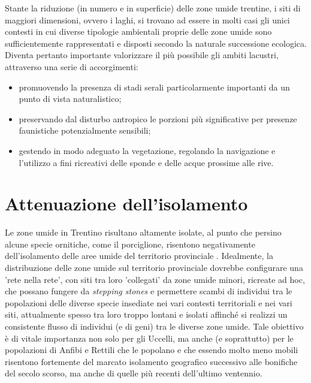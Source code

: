 \documentclass[10pt,twoside,openany,x11names,svgnames,italian,a5paper,dvipsnames,table]{memoir}
\begin{document}
Stante la riduzione (in numero e in superficie) delle zone umide trentine, i siti di maggiori dimensioni, ovvero i laghi, si trovano ad essere in molti casi gli unici contesti in cui diverse tipologie ambientali proprie delle zone umide sono sufficientemente rappresentati e disposti secondo la naturale successione ecologica. Diventa pertanto importante valorizzare il più possibile gli ambiti lacustri, attraverso una serie di accorgimenti:
\begin{itemize}\itemsep0pt
  \item promuovendo la presenza di stadi serali particolarmente importanti da un punto di vista naturalistico;
  \item preservando dal disturbo antropico le porzioni più significative per presenze faunistiche potenzialmente sensibili;
  \item gestendo in modo adeguato la vegetazione, regolando la navigazione e l'utilizzo a fini ricreativi delle sponde e delle acque prossime alle rive.
\end{itemize}

\section{Attenuazione dell'isolamento}
Le zone umide in Trentino risultano altamente isolate, al punto che persino alcune specie ornitiche, come il porciglione, risentono negativamente dell'isolamento delle aree umide del territorio provinciale \cite{Brambilla12}. Idealmente, la distribuzione delle zone umide sul territorio provinciale dovrebbe configurare una 'rete nella rete', con siti tra loro 'collegati' da zone umide minori, ricreate ad hoc, che possano fungere da \emph{stepping stones} e permettere scambi di individui tra le popolazioni delle diverse specie insediate nei vari contesti territoriali e nei vari siti, attualmente spesso tra loro troppo lontani e isolati affinché si realizzi un consistente flusso di individui (e di geni) tra le diverse zone umide. Tale obiettivo è di vitale importanza non solo per gli Uccelli, ma anche (e soprattutto) per le popolazioni di Anfibi e Rettili che le popolano e che essendo molto meno mobili risentono fortemente del marcato isolamento geografico successivo alle bonifiche del secolo scorso, ma anche di quelle più recenti dell’ultimo ventennio.  
\end{document}
